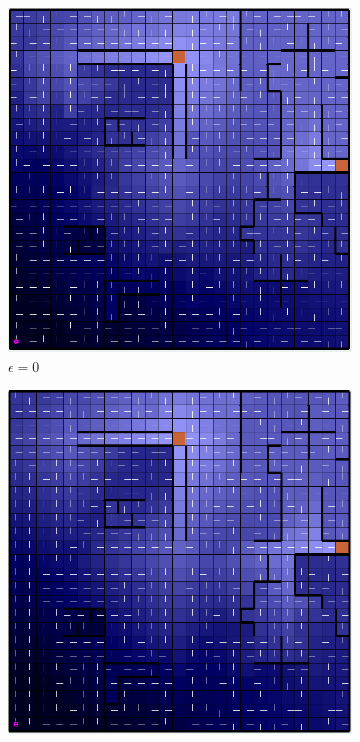 \documentclass[letterpaper]{article}
\begin{document}
	\begin{figure}
		\centering
		\begin{subfigure}{.3\textwidth}
			\centering
			\includegraphics[width=\linewidth]{images/big_ql_0}
			\caption{$\epsilon = 0$}
		\end{subfigure}
		\begin{subfigure}{.3\textwidth}
			\centering
			\includegraphics[width=\linewidth]{images/big_ql_01}

\end{subfigure}
\end{figure}
\end{document}
